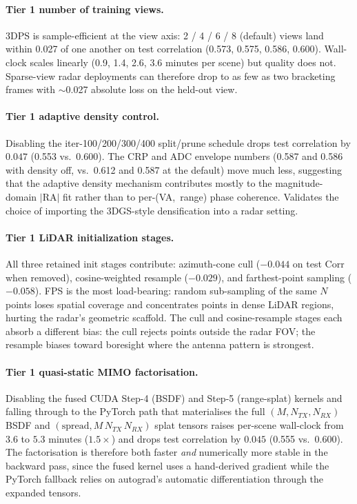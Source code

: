 \paragraph{Tier 1 \textemdash{} number of training views.} 3DPS is sample-efficient at the view axis: 2 / 4 / 6 / 8 (default) views land within 0.027 of one another on test correlation (0.573, 0.575, 0.586, 0.600). Wall-clock scales linearly (0.9, 1.4, 2.6, 3.6 minutes per scene) but quality does not. Sparse-view radar deployments can therefore drop to as few as two bracketing frames with $\sim$0.027 absolute loss on the held-out view.

\paragraph{Tier 1 \textemdash{} adaptive density control.} Disabling the iter-100/200/300/400 split/prune schedule drops test correlation by $0.047$ (0.553 vs.~0.600). The CRP and ADC envelope numbers (0.587 and 0.586 with density off, vs.\ 0.612 and 0.587 at the default) move much less, suggesting that the adaptive density mechanism contributes mostly to the magnitude-domain $|\mathrm{RA}|$ fit rather than to per-(VA,~range) phase coherence. Validates the choice of importing the 3DGS-style densification into a radar setting.

\paragraph{Tier 1 \textemdash{} LiDAR initialization stages.} All three retained init stages contribute: azimuth-cone cull ($-0.044$ on test Corr when removed), cosine-weighted resample ($-0.029$), and farthest-point sampling ($-0.058$). FPS is the most load-bearing: random sub-sampling of the same $N$ points loses spatial coverage and concentrates points in dense LiDAR regions, hurting the radar's geometric scaffold. The cull and cosine-resample stages each absorb a different bias: the cull rejects points outside the radar FOV; the resample biases toward boresight where the antenna pattern is strongest.

\paragraph{Tier 1 \textemdash{} quasi-static MIMO factorisation.} Disabling the fused CUDA Step-4 (BSDF) and Step-5 (range-splat) kernels and falling through to the PyTorch path that materialises the full $(M, N_{TX}, N_{RX})$ BSDF and $(\text{spread}, M\,N_{TX}\,N_{RX})$ splat tensors raises per-scene wall-clock from $3.6$ to $5.3$ minutes ($1.5\times$) and drops test correlation by $0.045$ (0.555 vs.~0.600). The factorisation is therefore both faster \emph{and} numerically more stable in the backward pass, since the fused kernel uses a hand-derived gradient while the PyTorch fallback relies on autograd's automatic differentiation through the expanded tensors.


